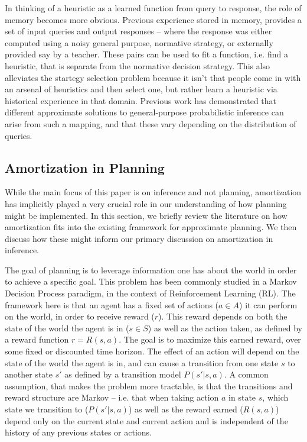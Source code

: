 In thinking of a heuristic as a learned function from query to response, the role of memory becomes more obvious. Previous experience stored in memory, provides a set of input queries and output responses -- where the response was either computed using a noisy general purpose, normative strategy, or externally provided say by a teacher. These pairs can be used to fit a function, i.e. find a heuristic, that is separate from the normative decision strategy. This also alleviates the startegy selection problem because it isn't that people come in with an arsenal of heuristics and then select one, but rather learn a heuristic via historical experience in that domain. Previous work \citep{gluck1988conditioning, dasgupta2019theory, shanks1991connectionist} has demonstrated that different approximate solutions to general-purpose probabilistic inference can arise from such a mapping, and that these vary depending on the distribution of queries. 


\subsection{Amortization in Planning}

While the main focus of this paper is on inference and not planning, amortization has implicitly played a very crucial role in our understanding of how planning might be implemented. In this section, we briefly review the literature on how amortization fits into the existing framework for approximate planning. We then discuss how these might inform our primary discussion on amortization in inference.

The goal of planning is to leverage information one has about the world in order to achieve a specific goal. This problem has been commonly studied in a Markov Decision Process paradigm, in the context of Reinforcement Learning (RL). The framework here is that an agent has a fixed set of actions ($a \in A$) it can perform on the world, in order to receive reward ($r$). This reward depends on both the state of the world the agent is in ($s \in S$) as well as the action taken, as defined by a reward function $r = R(s, a)$. The goal is to maximize this earned reward, over some fixed or discounted time horizon. The effect of an action will depend on the state of the world the agent is in, and can cause a transition from one state $s$ to another state $s'$ as defined by a transition model $P(s' | s, a)$. A common assumption, that makes the problem more tractable, is that the transitions and reward structure are Markov -- i.e. that when taking action $a$ in state $s$, which state we transition to ($P(s' | s, a)$) as well as the reward earned ($R(s,a)$) depend only on the current state and current action and is independent of the history of any previous states or actions.

